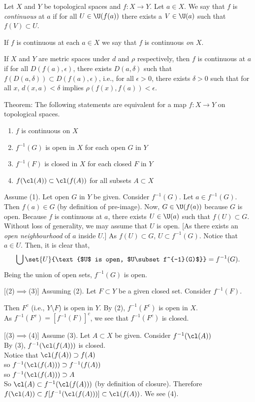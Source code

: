 Let $X$ and $Y$ be topological spaces and $f\colon X\to Y$.  Let $a\in X$.  We say that $f$ is \emph{continuous} at $a$ if for all $U\in\U(f(a))$
there exists a $V\in\U(a)$ such that $f(V)\subset U$.

If $f$ is continuous at each $a\in X$ we say that $f$ is continuous \emph{on\/ $X$}.

If $X$ and $Y$ are metric spaces under $d$ and $\rho$ respectively, then $f$ is continuous at $a$ if for all $D(f(a),\epsilon)$, there exists $D(a,\delta)$ such that $f(D(a,\delta))\subset D(f(a),\epsilon)$, i.e., for all $\epsilon>0$, there exists $\delta>0$ such that for all $x$, $d(x,a)<\delta$ implies $\rho(f(x),f(a))<\epsilon$.

Theorem: The following statements are equivalent for a map $f\colon X\to Y$ on topological spaces.
\begin{enumerate}[label=(\arabic*)]
\item $f$ is continuous on $X$
\item $f^{-1}(G)$ is open in $X$ for each open $G$ in $Y$
\item $f^{-1}(F)$ is closed in $X$ for each closed $F$ in $Y$
\item $f(\cl(A))\subset\cl(f(A))$ for all subsets $A\subset X$
\end{enumerate}
\pf [(1)$\implies$(2)]  Assume (1).  Let open $G$ in $Y$ be given.  Consider $f^{-1}(G)$. %
Let $a\in f^{-1}(G)$.  Then $f(a)\in G$ (by definition of pre-image).  Now, $G\in\U(f(a))$ because $G$ is open.  Because $f$ is continuous at $a$, there exists $U\in\U(a)$ such that $f(U)\subset G$.  Without loss of generality, we may assume that $U$ is open.  [As there exists an \emph{open neighbourhood} of $a$ inside $U$.]  As $f(U)\subset G$, $U\subset f^{-1}(G)$.  Notice that $a\in U$.  Then, it is clear that,
\[ \bigcup\set{U}{\text{$U$ is open, $U\subset f^{-1}(G)$}} = f^{-1}(G) . \]
Being the union of open sets, $f^{-1}(G)$ is open.

[(2)$\implies$(3)]  Assuming (2).  Let $F\subset Y$ be a given closed set.  Consider $f^{-1}(F)$. %

Then $F^c$ (i.e., $Y\setminus F$) is open in $Y$.  By (2), $f^{-1}(F^c)$ is open in $X$. \\
As $f^{-1}(F^c)=[f^{-1}(F)]^c$, we see that $f^{-1}(F^c)$ is closed.

[(3)$\implies$(4)]  Assume (3).  Let $A\subset X$ be given.  Consider $f^{-1}(\cl(A))$  \\
By (3), $f^{-1}(\cl(f(A)))$ is closed. \\
Notice that $\cl(f(A))\supset f(A)$ \\
so $f^{-1}(\cl(f(A)))\supset f^{-1}(f(A))$ \\
so $f^{-1}(\cl(f(A)))\supset A$ \\
So $\cl(A)\subset f^{-1}(\cl(f(A)))$ (by definition of closure).  Therefore $f(\cl(A))\subset f[f^{-1}(\cl(f(A)))]\subset\cl(f(A))$.  We see (4).

